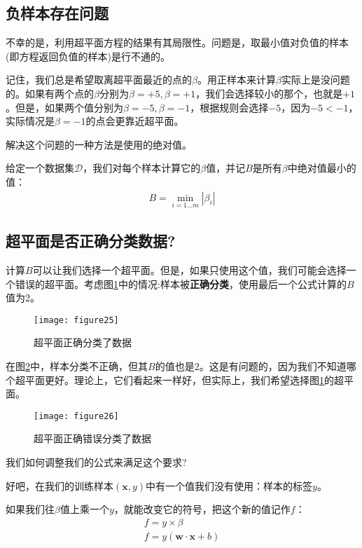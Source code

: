 \subsection{负样本存在问题}

不幸的是，利用超平面方程的结果有其局限性。问题是，取最小值对负值的样本(即方程返回负值的样本)是行不通的。

记住，我们总是希望取离超平面最近的点的$\beta$。用正样本来计算$\beta$实际上是没问题 的。如果有两个点的$\beta$分别为$\beta=+5,\beta=+1$，我们会选择较小的那个，也就是$+1$。但是，如果两个值分别为$\beta=-5,\beta=-1$，根据规则会选择$-5$，因为$-5<-1$，实际情况是$\beta=-1$的点会更靠近超平面。


解决这个问题的一种方法是使用的绝对值。

给定一个数据集$\mathcal{D}$，我们对每个样本计算它的$\beta$值，并记$B$是所有$\beta$中绝对值最小的值：
\begin{gather*}
B = \min_{i=1\dots m}|\beta_i|
\end{gather*}

\subsection{超平面是否正确分类数据?}

计算$B$可以让我们选择一个超平面。但是，如果只使用这个值，我们可能会选择一个错误的超平面。考虑图\ref{figure25}中的情况:样本被\textbf{正确分类}，使用最后一个公式计算的$B$值为2。


\begin{figure}[ht]
	\centering
	\texttt{[image: figure25]}
	\caption{超平面正确分类了数据}
	\label{figure25}
\end{figure}

在图\ref{figure26}中，样本分类不正确，但其$B$的值也是2。这是有问题的，因为我们不知道哪个超平面更好。理论上，它们看起来一样好，但实际上，我们希望选择图\ref{figure25}的超平面。

\begin{figure}[ht]
	\centering
	\texttt{[image: figure26]}
	\caption{超平面正确错误分类了数据}
	\label{figure26}
\end{figure}

我们如何调整我们的公式来满足这个要求?

好吧，在我们的训练样本$(\mathbf{x},y)$中有一个值我们没有使用：样本的标签$y$。

如果我们往$\beta$值上乘一个$y$，就能改变它的符号，把这个新的值记作$f$：
\begin{gather*}
f = y \times \beta \\
f = y(\mathbf{w}\cdot \mathbf{x} + b)
\end{gather*}

